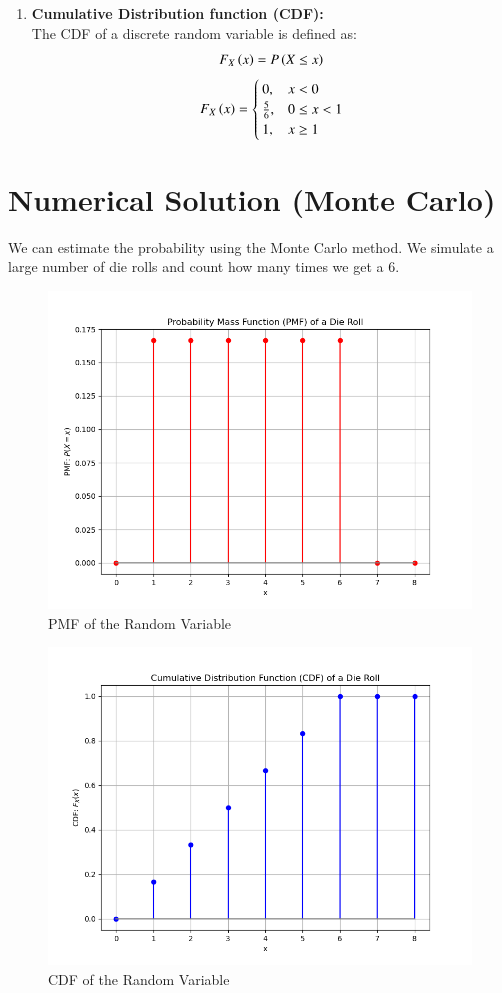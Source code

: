 \documentclass[journal]{IEEEtran}
\numberwithin{equation}{enumi}
\numberwithin{figure}{enumi}
\begin{document}
\begin{enumerate}
    \item \textbf{Cumulative Distribution function (CDF):}\\
    The CDF of a discrete random variable is defined as:\\
    \begin{align}
    	F_X\left(x\right) = P\left(X \leq x\right)
    \end{align}
    \begin{align}
            F_X\left(x\right) = \begin{cases}
                    0, & x < 0 \\
    \frac{5}{6}, & 0 \leq x < 1 \\
    1, & x \geq 1
            \end{cases}
    \end{align}
\end{enumerate}
\section{Numerical Solution (Monte Carlo)}
We can estimate the probability using the Monte Carlo method.  We simulate a large number of die rolls and count how many times we get a 6.
\begin{figure}[H]
    \centering
    \includegraphics[width=\columnwidth]{figs/pmf_die.png}
    \caption{PMF of the Random Variable}
    \label{fig:enter-label}
\end{figure}

\begin{figure}[H]
    \centering
    \includegraphics[width=\columnwidth]{figs/cdf_die.png}
    \caption{CDF of the Random Variable}
    \label{fig:enter-label}
\end{figure}
\end{document}
